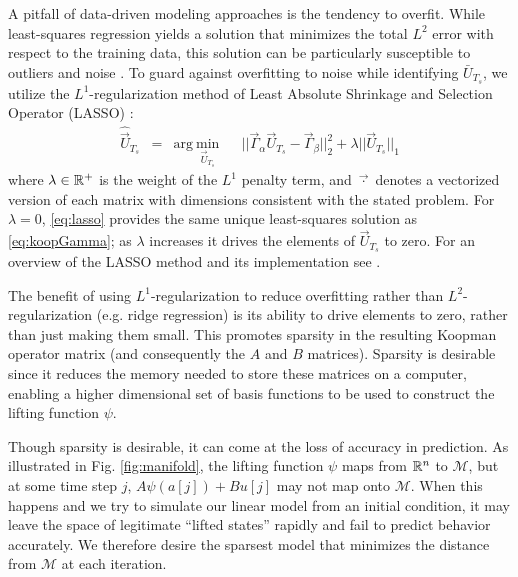 A pitfall of data-driven modeling approaches is the tendency to overfit.
While least-squares regression yields a solution that minimizes the total $L^2$ error with respect to the training data, this solution can be particularly susceptible to outliers and noise \cite{rousseeuw2005robust}.
To guard against overfitting to noise while identifying $\bar{U}_{T_s}$, we utilize the $L^1$-regularization method of Least Absolute Shrinkage and Selection Operator (LASSO) \cite{tibshirani1996regression}:
\begin{equation}
\begin{aligned}
\hat{\vec{U}}_{T_s} &= 
& \text{arg}~\underset{ \vec{U}_{T_s} }{\text{min}}
& & || \vec{\Gamma}_\alpha \vec{U}_{T_s} - \vec{\Gamma}_\beta ||_2^2 + \lambda || \vec{U}_{T_s} ||_1
\label{eq:lasso}
\end{aligned}
\end{equation}
where $\lambda \in \mathbb{R}^{+}$ is the weight of the $L^1$ penalty term, and $\vec{\cdot}$ denotes a vectorized version of each matrix with dimensions consistent with the stated problem.
For $\lambda = 0$, \eqref{eq:lasso} provides the same unique least-squares solution as \eqref{eq:koopGamma}; as $\lambda$ increases it drives the elements of $\vec{U}_{T_s}$ to zero.
For an overview of the LASSO method and its implementation see \citet{tibshirani1996regression}.

The benefit of using $L^1$-regularization to reduce overfitting rather than $L^2$-regularization (e.g. ridge regression) is its ability to drive elements to zero, rather than just making them small.
This promotes sparsity in the resulting Koopman operator matrix (and consequently the $A$ and $B$ matrices).
Sparsity is desirable since it reduces the memory needed to store these matrices on a computer, enabling a higher dimensional set of basis functions to be used to construct the lifting function $\psi$.

Though sparsity is desirable, it can come at the loss of accuracy in prediction. 
As illustrated in Fig. \ref{fig:manifold}, the lifting function $\psi$ maps from $\mathbb{R}^n$ to $\mathcal{M}$, but at some time step $j$, $A\psi(a[j]) + B u[j]$ may not map onto $\mathcal{M}$.
When this happens and we try to simulate our linear model from an initial condition, it may leave the space of legitimate ``lifted states'' rapidly and fail to predict behavior accurately.
We therefore desire the sparsest model that minimizes the distance from $\mathcal{M}$ at each iteration.

